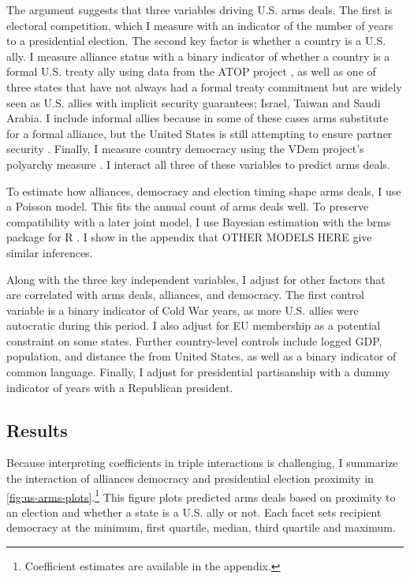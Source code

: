 \documentclass[12pt]{article}
\begin{document}
The argument suggests that three variables driving U.S. arms deals. 
The first is electoral competition, which I measure with an indicator of the number of years to a presidential election. 
The second key factor is whether a country is a U.S. ally. 
I measure alliance status with a binary indicator of whether a country is a formal U.S. treaty ally using data from the ATOP project \citep{Leedsetal2002}, as well as one of three states that have not always had a formal treaty commitment but are widely seen as U.S. allies with implicit security guarantees; Israel, Taiwan and Saudi Arabia. 
I include informal allies because in some of these cases arms substitute for a formal alliance, but the United States is still attempting to ensure partner security \citep{Yarhi-Miloetal2016}. 
Finally, I measure country democracy using the VDem project's polyarchy measure \citep{Coppedgeetal2008}. 
I interact all three of these variables to predict arms deals. 


To estimate how alliances, democracy and election timing shape arms deals, I use a Poisson model.
This fits the annual count of arms deals well.
To preserve compatibility with a later joint model, I use Bayesian estimation with the brms package for \textsf{R} \citep{Buerkner2017}. 
I show in the appendix that OTHER MODELS HERE give similar inferences. 


Along with the three key independent variables, I adjust for other factors that are correlated with arms deals, alliances, and democracy. 
The first control variable is a binary indicator of Cold War years, as more U.S. allies were autocratic during this period. 
I also adjust for EU membership as a potential constraint on some states. 
Further country-level controls include logged GDP, population, and distance the from United States, as well as a binary indicator of common language. 
Finally, I adjust for presidential partisanship with a dummy indicator of years with a Republican president.  



\subsection{Results}


Because interpreting coefficients in triple interactions is challenging, I summarize the interaction of alliances democracy and presidential election proximity in \autoref{fig:us-arms-plots}.\footnote{Coefficient estimates are available in the appendix.}
This figure plots predicted arms deals based on proximity to an election and whether a state is a U.S. ally or not. 
Each facet sets recipient democracy at the minimum, first quartile, median, third quartile and maximum.
\end{document}
